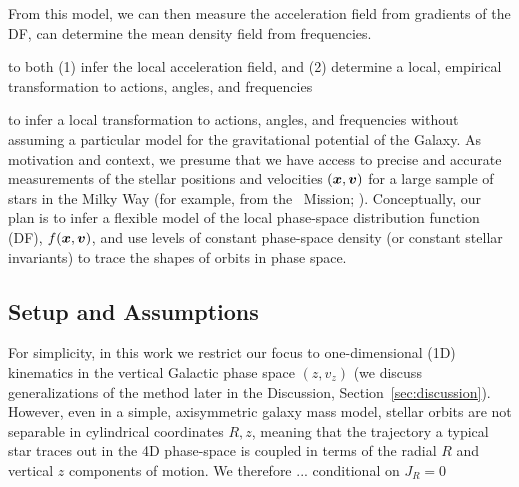 From this model, we can then measure the acceleration field from gradients of the DF, can determine the mean density field from frequencies.

to both (1) infer the local acceleration field, and (2) determine a local, empirical transformation to actions, angles, and frequencies

to infer a local transformation to actions, angles,
and frequencies without assuming a particular model for the gravitational potential of
the Galaxy.
As motivation and context, we presume that we have access to precise and accurate
measurements of the stellar positions and velocities $(\boldsymbol{x}, \boldsymbol{v})$ for a large
sample of stars in the Milky Way (for example, from the \gaia\ Mission; \citealt{TODO}).
Conceptually, our plan is to infer a flexible model of the local phase-space
distribution function (DF), $f(\boldsymbol{x}, \boldsymbol{v})$, and use levels of constant phase-space
density (or constant stellar invariants) to trace the shapes of orbits in phase space.


\subsection{Setup and Assumptions} \label{sec:methods-setup}

For simplicity, in this work we restrict our focus to one-dimensional (1D) kinematics in
the vertical Galactic phase space $(z, v_z)$ (we discuss generalizations of the method
later in the Discussion, Section~\ref{sec:discussion}). %
However, even in a simple, axisymmetric galaxy mass model, stellar orbits are not
separable in cylindrical coordinates $R, z$, meaning that the trajectory a typical star
traces out in the 4D phase-space is coupled in terms of the radial $R$ and vertical $z$
components of motion.
We therefore ... conditional on $J_R=0$


